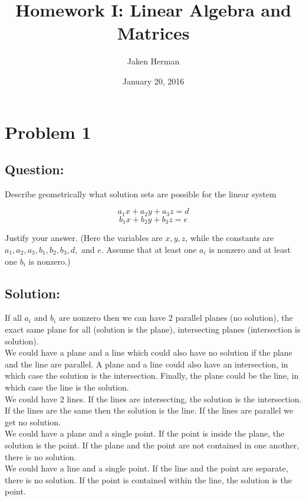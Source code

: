 \documentclass{article}
\title{Homework I: Linear Algebra and Matrices}
\author{Jaken Herman }
\date{January 20, 2016}
\begin{document}
\maketitle

\section*{Problem 1}
\subsection*{Question:}
Describe geometrically what solution sets are possible for the linear system

$$a_{1}x + a_{2}y + a_{3}z = d$$
$$b_{1}x + b_{2}y + b_{3}z = e$$

Justify your answer. (Here the variables are $x, y, z$, while the constants are $a_{1}, a_{2}, a_{3}, b_{1}, b_{2}, b_{3}, d,$ and $e$. Assume that at least one $a_{i}$ is nonzero and at least one $b_{i}$ is nonzero.)

\subsection*{Solution:}
If all $a_i$ and $b_{i}$ are nonzero then we can have 2 parallel planes (no solution), the exact same plane for all (solution is the plane), intersecting planes (intersection is solution).
\\

We could have a plane and a line which could also have no solution if the plane and the line are parallel. A plane and a line could also have an intersection, in which case the solution is the intersection. Finally, the plane could be the line, in which case the line is the solution.
\\

We could have 2 lines. If the lines are intersecting, the solution is the intersection. If the lines are the same then the solution is the line. If the lines are parallel we get no solution.
\\

We could have a plane and a single point. If the point is inside the plane, the solution is the point. If the plane and the point are not contained in one another, there is no solution.
\\

We could have a line and a single point. If the line and the point are separate, there is no solution. If the point is contained within the line, the solution is the point.
\\
\end{document}
